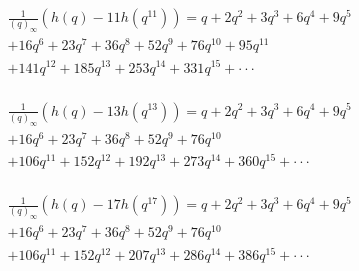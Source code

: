 \documentclass[11pt,reqno]{amsart}
\theoremstyle{definition}
\numberwithin{equation}{section}
\begin{document}
 
\begin{equation*}
\begin{aligned}& \frac{1}{(q)_{\infty}} ( h(q) - 11 h(q^{11}) ) =q + 2 q^2 + 3 q^3 + 6 q^4 + 9 q^5\\
& +16q^6 + 23q^7 + 36 q^8 
 +52q^9 + 76q^{10 }+ 95q^{11}\\
 & + 141 q^{12} + 185 q^{13} +253 q^{14} + 331 q^{15}+\cdot\cdot\cdot \\
  \end{aligned}
 \end{equation*} 

 \begin{equation*}
\begin{aligned}
 & \frac{1}{(q)_{\infty}} ( h(q) - 13 h(q^{13}) )=q + 2 q^2 + 3 q^3 + 6 q^4 + 9 q^5\\
 & + 16 q^6 + 23 q^7 + 36 q^8 + 
 52 q^9 + 76 q^{10}\\
 & + 106 q^{11} + 152 q^{12} + 192 q^{13} + 273 q^{14} +360q^{15}+ \cdot\cdot\cdot\\
  \end{aligned}
 \end{equation*} 

 \begin{equation*}
\begin{aligned} & \frac{1}{(q)_{\infty}} ( h(q) - 17 h(q^{17}) )=q + 2 q^2 + 3 q^3 + 6 q^4 + 9 q^5\\
 &+16q^6 + 23 q^7 + 36 q^8 + 
52 q^9 + 76q^{10}\\
 & + 106 q^{11} + 152 q^{12} + 207 q^{13} + 286 q^{14 }+ 
 386 q^{15} + \cdot\cdot\cdot\\
  \end{aligned}
 \end{equation*} 
 
 
\end{document}
